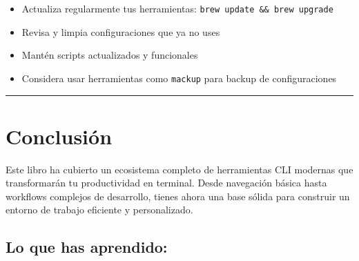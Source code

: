 \documentclass[
  11pt,
  letterpaper,
  oneside,
  openany]{scrbook}
\providecommand{\tightlist}{%
  \setlength{\itemsep}{0pt}\setlength{\parskip}{0pt}}
\begin{document}
\begin{tcolorbox}[enhanced jigsaw, toprule=.15mm, bottomrule=.15mm, opacityback=0, coltitle=black, rightrule=.15mm, colframe=quarto-callout-important-color-frame, titlerule=0mm, opacitybacktitle=0.6, left=2mm, colback=white, bottomtitle=1mm, arc=.35mm, leftrule=.75mm, title=\textcolor{quarto-callout-important-color}{\faExclamation}\hspace{0.5em}{Mantenimiento del entorno}, colbacktitle=quarto-callout-important-color!10!white, breakable, toptitle=1mm]

\begin{itemize}
\tightlist
\item
  Actualiza regularmente tus herramientas:
  \texttt{brew\ update\ \&\&\ brew\ upgrade}
\item
  Revisa y limpia configuraciones que ya no uses
\item
  Mantén scripts actualizados y funcionales
\item
  Considera usar herramientas como \texttt{mackup} para backup de
  configuraciones
\end{itemize}

\end{tcolorbox}

\begin{center}\rule{0.5\linewidth}{0.5pt}\end{center}

\section{Conclusión}\label{conclusiuxf3n}

Este libro ha cubierto un ecosistema completo de herramientas CLI
modernas que transformarán tu productividad en terminal. Desde
navegación básica hasta workflows complejos de desarrollo, tienes ahora
una base sólida para construir un entorno de trabajo eficiente y
personalizado.

\subsection{Lo que has aprendido:}\label{lo-que-has-aprendido}
\end{document}
